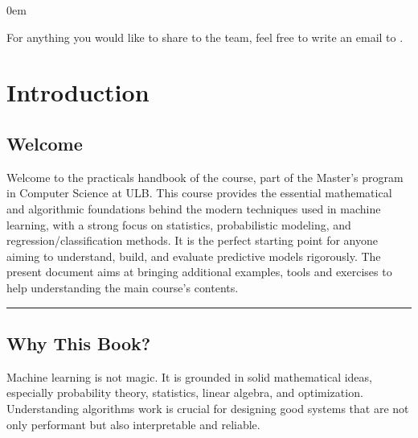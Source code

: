 \documentclass[letterpaper,10pt,english]{jupyterBook}
\begin{document}
\begin{DUlineblock}{0em}
\item[] 
\end{DUlineblock}

\sphinxAtStartPar
For anything you would like to share to the team, feel free to write an e\sphinxhyphen{}mail to .

\sphinxstepscope


\chapter{Introduction}
\label{\detokenize{introduction:introduction}}\label{\detokenize{introduction::doc}}

\section{Welcome}
\label{\detokenize{introduction:welcome}}
\sphinxAtStartPar
Welcome to the practicals handbook of the  course, part of the Master’s program in Computer Science at ULB. This course provides the essential mathematical and algorithmic foundations behind the modern techniques used in machine learning, with a strong focus on statistics, probabilistic modeling, and regression/classification methods. It is the perfect starting point for anyone aiming to understand, build, and evaluate predictive models rigorously. The present document aims at bringing additional examples, tools and exercises to help understanding the main course’s contents.


\bigskip\hrule\bigskip



\section{Why This Book?}
\label{\detokenize{introduction:why-this-book}}
\sphinxAtStartPar
Machine learning is not magic. It is grounded in solid mathematical ideas, especially probability theory, statistics, linear algebra, and optimization. Understanding  algorithms work is crucial for designing good systems that are not only performant but also interpretable and reliable.
\end{document}
